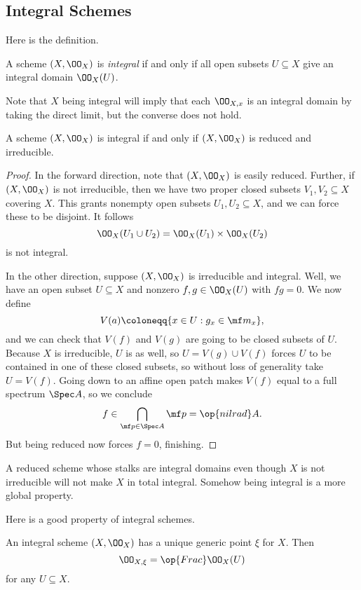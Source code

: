 \documentclass[../notes.tex]{subfiles}
\begin{document}
\subsection{Integral Schemes}
Here is the definition.
\begin{definition}[Integral]
	A scheme $(X,\OO_X)$ is \textit{integral} if and only if all open subsets $U\subseteq X$ give an integral domain $\OO_X(U)$.
\end{definition}
\begin{remark}
	Note that $X$ being integral will imply that each $\OO_{X,x}$ is an integral domain by taking the direct limit, but the converse does not hold.
\end{remark}
\begin{proposition}
	A scheme $(X,\OO_X)$ is integral if and only if $(X,\OO_X)$ is reduced and irreducible.
\end{proposition}
\begin{proof}
	In the forward direction, note that $(X,\OO_X)$ is easily reduced. Further, if $(X,\OO_X)$ is not irreducible, then we have two proper closed subsets $V_1,V_2\subseteq X$ covering $X$. This grants nonempty open subsets $U_1,U_2\subseteq X$, and we can force these to be disjoint. It follows
	\[\OO_X(U_1\cup U_2)=\OO_X(U_1)\times\OO_X(U_2)\]
	is not integral.

	In the other direction, suppose $(X,\OO_X)$ is irreducible and integral. Well, we have an open subset $U\subseteq X$ and nonzero $f,g\in\OO_X(U)$ with $fg=0$. We now define
	\[V(a)\coloneqq\{x\in U:g_x\in\mf m_x\},\]
	and we can check that $V(f)$ and $V(g)$ are going to be closed subsets of $U$. Because $X$ is irreducible, $U$ is as well, so $U= V(g)\cup V(f)$ forces $U$ to be contained in one of these closed subsets, so without loss of generality take $U=V(f)$. Going down to an affine open patch makes $V(f)$ equal to a full spectrum $\Spec A$, so we conclude
	\[f\in\bigcap_{\mf p\in\Spec A}\mf p=\op{nilrad}A.\]
	But being reduced now forces $f=0$, finishing.
\end{proof}
\begin{example}
	A reduced scheme whose stalks are integral domains even though $X$ is not irreducible will not make $X$ in total integral. Somehow being integral is a more global property.
\end{example}
Here is a good property of integral schemes.
\begin{proposition}
	An integral scheme $(X,\OO_X)$ has a unique generic point $\xi$ for $X$. Then
	\[\OO_{X,\xi}=\op{Frac}\OO_X(U)\]
	for any $U\subseteq X$.
\end{proposition}
\end{document}
